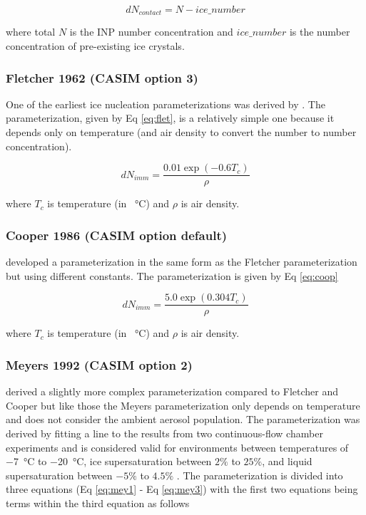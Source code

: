 \begin{equation} \label{eq:case5}
dN_{contact} = N - ice\_number
\end{equation}

where total $N$ is the INP number concentration and $ice\_number$ is the number concentration of pre-existing ice crystals.


\subsubsection{Fletcher 1962 (CASIM option 3)}
One of the earliest ice nucleation parameterizations was derived by \cite{flet1962}. The parameterization, given by Eq \ref{eq:flet}, is a relatively simple one because it depends only on temperature (and air density to convert the number to number concentration).

\begin{equation} \label{eq:flet}
dN_{imm} = \frac{0.01\exp(-0.6T_c)}{\rho}
\end{equation}

where $T_c$ is temperature (in \SI{}{\degreeCelsius}) and $\rho$ is air density.


\subsubsection{Cooper 1986 (CASIM option default)}
\cite{coop1986} developed a parameterization in the same form as the Fletcher parameterization but using different constants. The parameterization is given by Eq \ref{eq:coop}

\begin{equation} \label{eq:coop}
dN_{imm} = \frac{5.0\exp(0.304T_c)}{\rho}
\end{equation}

where $T_c$ is temperature (in \SI{}{\degreeCelsius}) and $\rho$ is air density.


\subsubsection{Meyers 1992 (CASIM option 2)}
\cite{meye1992} derived a slightly more complex parameterization compared to Fletcher and Cooper but like those the Meyers parameterization only depends on temperature and does not consider the ambient aerosol population. The parameterization was derived by fitting a line to the results from two continuous-flow chamber experiments and is considered valid for environments between temperatures of \SI{-7}{\degreeCelsius} to \SI{-20}{\degreeCelsius}, ice supersaturation between $2\%$ to $25\%$, and liquid supersaturation between $-5\%$ to $4.5\%$ \citep{meye1992}. The parameterization is divided into three equations (Eq \ref{eq:mey1} - Eq \ref{eq:mey3}) with the first two equations being terms within the third equation as follows

